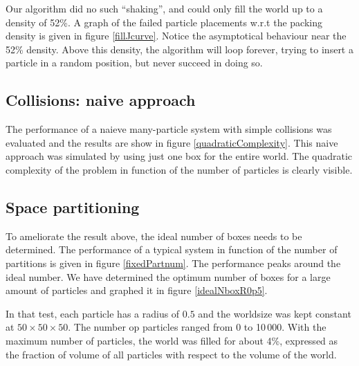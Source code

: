 
Our algorithm did no such ``shaking'', and could only fill the world up to 
a density of 52\%. A graph of the failed particle placements w.r.t the 
packing density is given in figure \ref{fillJcurve}. Notice the 
asymptotical behaviour near the 52\% density. Above this density, the 
algorithm will loop forever, trying to insert a particle in a random 
position, but never succeed in doing so.





\subsection{Collisions: naive approach}
The performance of a naieve many-particle system with simple collisions was 
evaluated and the results are show in figure \ref{quadraticComplexity}.  
This naive approach was simulated by using just one box for the entire 
world. The quadratic complexity of the problem in function of the number of 
particles is clearly visible.




\subsection{Space partitioning}
To ameliorate the result above, the ideal number of boxes needs to be 
determined.  The performance of a typical system in function of the number 
of partitions is given in figure \ref{fixedPartnum}. The performance peaks 
around the ideal number.  We have determined the optimum number of boxes 
for a large amount of particles and graphed it in figure 
	\ref{idealNboxR0p5}.



In that test, each particle has a radius of $0.5$ and the worldsize was 
kept constant at $50 \times 50 \times 50$. The number op particles ranged 
from 0 to 10\,000. With the maximum number of particles, the world was 
filled for about 4\%, expressed as the fraction of volume of all particles 
with respect to the volume of the world.

